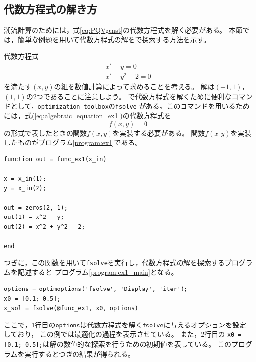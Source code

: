 \documentclass[tombow,dvipdfmx]{corona-a5-1.1}
\begin{document}
\subsection{代数方程式の解き方}
潮流計算のためには，式\ref{eq:PQVgenst}の代数方程式を解く必要がある。
本節では，簡単な例題を用いて代数方程式の解を\matlab で探索する方法を示す。
\begin{例}[代数方程式の解の探索]\label{ex:algenraic_equation_ex1}
代数方程式
\begin{subequations}\label{eq:algebraic_equation_ex1}
\begin{align}
x^2 - y = 0\\
x^2 + y^2 - 2 = 0
\end{align}
\end{subequations}
を満たす$(x, y)$の組を数値計算によって求めることを考える。
解は$(-1, 1)$，$(1, 1)$の2つであることに注意しよう。
\matlab で代数方程式を解くために便利なコマンドとして，\verb|optimization toolbox|の\verb|fsolve|
がある。このコマンドを用いるためには，式(\ref{eq:algebraic_equation_ex1})の代数方程式を
\[
f(x,y)=0
\]
の形式で表したときの関数$f(x,y)$を実装する必要がある。
関数$f(x,y)$を実装したものがプログラム\nobreak\ref{program:ex1}である。

\smallskip
\begin{PROGRAMA}[count,title={func\_ex1.m}]\label{program:ex1}
\begin{verbatim}
function out = func_ex1(x_in)

x = x_in(1);
y = x_in(2);

out = zeros(2, 1);
out(1) = x^2 - y;
out(2) = x^2 + y^2 - 2;

end
\end{verbatim}
\end{PROGRAMA}

つぎに，この関数を用いて\verb|fsolve|を実行し，代数方程式の解を探索するプログラムを記述すると
プログラム\nobreak\ref{program:ex1_main}となる。
\smallskip
\begin{PROGRAMA}[count,title={main\_ex1.m}]\label{program:ex1_main}
\begin{verbatim}
options = optimoptions('fsolve', 'Display', 'iter');
x0 = [0.1; 0.5];
x_sol = fsolve(@func_ex1, x0, options)
\end{verbatim}
\end{PROGRAMA}

ここで，1行目の\verb|options|は代数方程式を解く\verb|fsolve|に与えるオプションを設定しており，
この例では最適化の過程を表示させている。
また，2行目の
\verb|x0 = [0.1; 0.5];|は解の数値的な探索を行うための初期値を表している。
このプログラムを実行するとつぎの結果が得られる。


\end{例}
\end{document}
